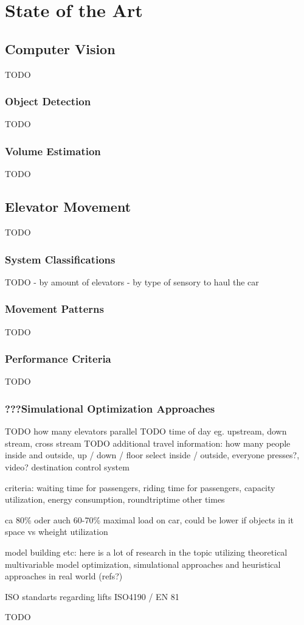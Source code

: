 \chapter{State of the Art}
\label{chap:sota}

\section{Computer Vision}

TODO

\subsection{Object Detection}

TODO

\subsection{Volume Estimation}

TODO

\section{Elevator Movement}
TODO

\subsection{System Classifications}
TODO
- by amount of elevators
- by type of sensory to haul the car

\subsection{Movement Patterns}
TODO

\subsection{Performance Criteria}
TODO

\subsection{???Simulational Optimization Approaches}

TODO how many elevators parallel
TODO time of day eg. upstream, down stream, cross stream
TODO additional travel information: how many people inside and outside, up / down / floor select inside / outside, everyone presses?, video? 
destination control system

criteria: waiting time for passengers, riding time for passengers, capacity utilization, energy consumption, roundtriptime other times

ca 80\% oder auch 60-70\% maximal load on car, could be lower if objects in it
space vs wheight utilization

model building etc: here is a lot of research in the topic utilizing theoretical multivariable model optimization, simulational approaches and heuristical approaches in real world (refs?)

ISO standarts regarding lifts ISO4190 / EN 81

TODO
